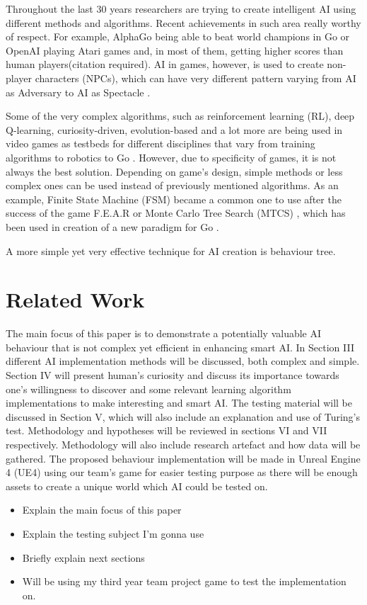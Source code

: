 \documentclass[journal]{IEEEtran}
\begin{document}
Throughout the last 30 years researchers are trying to create intelligent AI using different methods and algorithms. Recent achievements in such area really worthy of respect. For example, AlphaGo being able to beat world champions in Go \cite{alphago} or OpenAI playing Atari games and, in most of them, getting higher scores than human players(citation required). AI in games, however, is used to create non-player characters (NPCs), which can have very different pattern varying from AI as Adversary to AI as Spectacle \cite{treanor2015ai}. 

Some of the very complex algorithms, such as reinforcement learning (RL), deep Q-learning, curiosity-driven, evolution-based and a lot more are being used in video games as testbeds for different disciplines that vary from training algorithms to robotics to Go \cite{schaul2011measuring}\cite{alphago}\cite{aiinvideogames}. However, due to specificity of games, it is not always the best solution. Depending on game's design, simple methods or less complex ones can be used instead of previously mentioned algorithms. As an example, Finite State Machine (FSM) became a common one to use after the success of the game F.E.A.R \cite{orkin2006three} or Monte Carlo Tree Search (MTCS) \cite{chaslot2008monte}, which has been used in creation of a new paradigm for Go \cite{gelly2011monte}\cite{gelly2012grand}. 

A more simple yet very effective technique for AI creation is behaviour tree. 

\section{Related Work} %
The main focus of this paper is to demonstrate a potentially valuable AI behaviour that is not complex yet efficient in enhancing smart AI. In Section III different AI implementation methods will be discussed, both complex and simple. Section IV will present human's curiosity and discuss its importance towards one's willingness to discover and some relevant learning algorithm implementations to make interesting and smart AI. The testing material will be discussed in Section V, which will also include an explanation and use of Turing's test. Methodology and hypotheses will be reviewed in sections VI and VII respectively. Methodology will also include research artefact and how data will be gathered. The proposed behaviour implementation will be made in Unreal Engine 4 (UE4) using our team's game for easier testing purpose as there will be enough assets to create a unique world which AI could be tested on.
\begin{itemize}
	\item Explain the main focus of this paper
	\item Explain the testing subject I'm gonna use
	\item Briefly explain next sections
	\item Will be using my third year team project game to test the implementation on.
\end{itemize}
\end{document}
